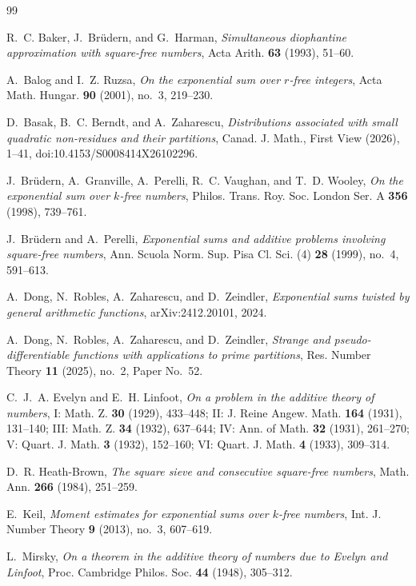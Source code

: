 \documentclass[11pt]{amsart}
\numberwithin{equation}{section}
\numberwithin{figure}{section}
\theoremstyle{definition}
\begin{document}
\begin{thebibliography}{99}

R.~C. Baker, J.~Br\"udern, and G.~Harman,
\emph{Simultaneous diophantine approximation with square-free numbers},
Acta Arith. \textbf{63} (1993), 51--60.

A.~Balog and I.~Z. Ruzsa,
\emph{On the exponential sum over $r$-free integers},
Acta Math. Hungar. \textbf{90} (2001), no.~3, 219--230.

D.~Basak, B.~C. Berndt, and A.~Zaharescu,
\emph{Distributions associated with small quadratic non-residues and their partitions},
Canad. J. Math., First View (2026), 1--41, doi:10.4153/S0008414X26102296.

J.~Br\"udern, A.~Granville, A.~Perelli, R.~C. Vaughan, and T.~D. Wooley,
\emph{On the exponential sum over $k$-free numbers},
Philos. Trans. Roy. Soc. London Ser. A \textbf{356} (1998), 739--761.

J.~Br\"udern and A.~Perelli,
\emph{Exponential sums and additive problems involving square-free numbers},
Ann. Scuola Norm. Sup. Pisa Cl. Sci. (4) \textbf{28} (1999), no.~4, 591--613.

A.~Dong, N.~Robles, A.~Zaharescu, and D.~Zeindler,
\emph{Exponential sums twisted by general arithmetic functions},
arXiv:2412.20101, 2024.

A.~Dong, N.~Robles, A.~Zaharescu, and D.~Zeindler,
\emph{Strange and pseudo-differentiable functions with applications to prime partitions},
Res. Number Theory \textbf{11} (2025), no.~2, Paper No.~52.

C.~J.~A. Evelyn and E.~H. Linfoot,
\emph{On a problem in the additive theory of numbers},
I: Math. Z. \textbf{30} (1929), 433--448;
II: J. Reine Angew. Math. \textbf{164} (1931), 131--140;
III: Math. Z. \textbf{34} (1932), 637--644;
IV: Ann. of Math. \textbf{32} (1931), 261--270;
V: Quart. J. Math. \textbf{3} (1932), 152--160;
VI: Quart. J. Math. \textbf{4} (1933), 309--314.

D.~R. Heath-Brown,
\emph{The square sieve and consecutive square-free numbers},
Math. Ann. \textbf{266} (1984), 251--259.

E.~Keil,
\emph{Moment estimates for exponential sums over $k$-free numbers},
Int. J. Number Theory \textbf{9} (2013), no.~3, 607--619.

L.~Mirsky,
\emph{On a theorem in the additive theory of numbers due to Evelyn and Linfoot},
Proc. Cambridge Philos. Soc. \textbf{44} (1948), 305--312.


\end{thebibliography}
\end{document}
